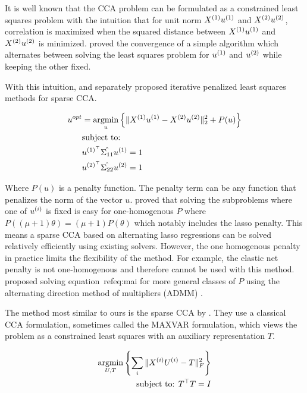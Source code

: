 It is well known that the CCA problem can be formulated as a constrained least squares problem with the intuition that
for unit norm \(X^{(1)} u^{(1)}\) and \(X^{(2)} u^{(2)}\), correlation is maximized when the squared distance
between \(X^{(1)} u^{(1)}\) and \(X^{(2)} u^{(2)}\) is minimized. \citep{golub1995canonical} proved the
convergence of a simple algorithm which alternates between solving the least squares problem for \(u^{(1)}\) and
\(u^{(2)}\) while keeping the other fixed.

With this intuition, \citep{wilms2015sparse} and \citep{mai2019iterative} separately proposed iterative penalized least
squares methods for sparse CCA.

\begin{align}
    \label{eq:mai}
    u^{opt} &= \underset{u}{\mathrm{argmin}} \left\{ \|X^{(1)}u^{(1)} - X^{(2)}u^{(2)}\|_2^2 + P(u) \right\} \\
    &\text{subject to:} \notag \\
    &u^{(1)^{\top}} \hat{\Sigma_{11}} u^{(1)}=1 \notag \\
    &u^{(2)^{\top}} \hat{\Sigma_{22}} u^{(2)}=1 \notag
\end{align}

Where \(P(u)\) is a penalty function.
The penalty term can be any function that penalizes the norm of the vector \(u\).
\citep{mai2019iterative} proved that solving the subproblems where one of $u^{(i)}$ is fixed is easy for one-homogenous $P$ where
\( P((\mu + 1)\theta) = (\mu + 1)P(\theta) \) which notably includes the lasso penalty.
This means a sparse CCA based
on alternating lasso regressions can be solved relatively efficiently using existing solvers.
However, the one homogenous penalty in practice limits the flexibility of the method.
For example, the elastic net penalty is not one-homogenous and therefore cannot be used with this method.\citep{
    kanatsoulis2018structured} proposed solving equation~ref{eq:mai} for more general classes of $P$ using the
alternating direction method of multipliers (ADMM) \citep{boyd2011distributed}.

The method most similar to ours is the sparse CCA by \citep{fu2017scalable}.
They use a classical CCA formulation, sometimes called the MAXVAR formulation, which views the problem as a constrained least squares with an auxiliary representation $T$\citep{carroll1968generalization,kettenring1971canonical}.


\begin{align}\label{eq:fu}
    \underset{U, T}{\mathrm{argmin}}\left\{\sum_i \|X^{(i)} U^{(i)} - T\|_F^2\right\}\\
    \text{subject to: }T^\top T = I\\
\end{align}

